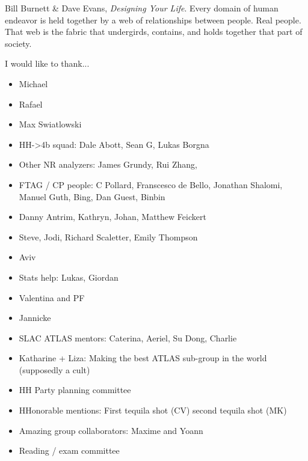 
\begin{chapquote}{Bill Burnett \& Dave Evans, \emph{Designing Your Life}.}
{Every domain of human endeavor is held together by a web of relationships between people. Real people. That web is the fabric that undergirds, contains, and holds together that part of society.}
\end{chapquote}


I would like to thank...

\begin{itemize}
	\item Michael
	\item Rafael
	\item Max Swiatlowski
	\item HH->4b squad: Dale Abott, Sean G, Lukas Borgna 
	\item Other NR analyzers: James Grundy, Rui Zhang,
	\item FTAG / CP people: C Pollard, Franscesco de Bello, Jonathan Shalomi, Manuel Guth, Bing, Dan Guest, Binbin
	\item Danny Antrim, Kathryn, Johan, Matthew Feickert
	\item Steve, Jodi, Richard Scaletter, Emily Thompson
	\item Aviv
	\item Stats help: Lukas, Giordan
	\item Valentina and PF
	\item Jannicke
	\item SLAC ATLAS mentors: Caterina, Aeriel, Su Dong, Charlie
	\item Katharine + Liza: Making the best ATLAS sub-group in the world (supposedly a cult)
	\item HH Party planning committee
	\item HHonorable mentions: First tequila shot (CV) second tequila shot (MK)
	\item Amazing group collaborators: Maxime and Yoann
	\item Reading / exam committee
\end{itemize}
